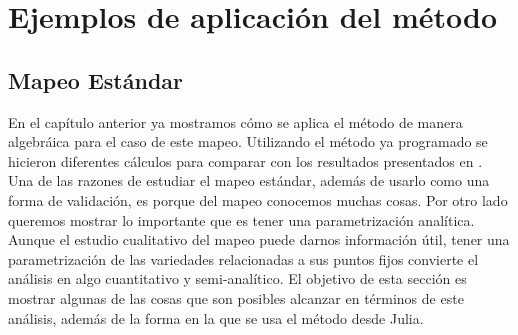 
\chapter{Ejemplos de aplicación del método}
\section{Mapeo Estándar}
En el capítulo anterior ya mostramos cómo se aplica el método de manera algebráica para el caso de este mapeo. Utilizando el método ya programado se hicieron diferentes cálculos para comparar con los resultados presentados en \citep{Mireles} . Una de las razones de estudiar el mapeo estándar, además de usarlo como una forma de validación, es porque del mapeo conocemos muchas cosas. Por otro lado queremos mostrar lo importante que es tener una parametrización analítica. Aunque el estudio cualitativo del mapeo puede darnos información útil, tener una parametrización de las variedades relacionadas a sus puntos fijos convierte el análisis en algo cuantitativo y semi-analítico. El objetivo de esta sección es mostrar algunas de las cosas que son posibles alcanzar en términos de este análisis, además de la forma en la que se usa el método desde Julia.\\

